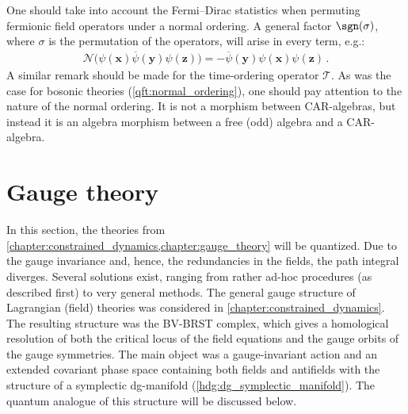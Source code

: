 
    \begin{remark}\label{qft:ordering_morphism}
        One should take into account the Fermi--Dirac statistics when permuting fermionic field operators under a normal ordering. A general factor $\sgn(\sigma)$, where $\sigma$ is the permutation of the operators, will arise in every term, e.g.:
        \begin{gather}
            \mathcal{N}\bigl(\psi(\symbf{x})\overline\psi(\symbf{y})\psi(\symbf{z})\bigr) = -\overline\psi(\symbf{y})\psi(\symbf{x})\psi(\symbf{z})\,.
        \end{gather}
        A similar remark should be made for the time-ordering operator $\mathcal{T}$. As was the case for bosonic theories (\cref{qft:normal_ordering}), one should pay attention to the nature of the normal ordering. It is not a morphism between CAR-algebras, but instead it is an algebra morphism between a free (odd) algebra and a CAR-algebra.
    \end{remark}

\section{Gauge theory}\label{section:qft_gauge_theory}

    In this section, the theories from \cref{chapter:constrained_dynamics,chapter:gauge_theory} will be quantized. Due to the gauge invariance and, hence, the redundancies in the fields, the path integral diverges. Several solutions exist, ranging from rather ad-hoc procedures (as described first) to very general methods. The general gauge structure of Lagrangian (field) theories was considered in \cref{chapter:constrained_dynamics}. The resulting structure was the BV-BRST complex, which gives a homological resolution of both the critical locus of the field equations and the gauge orbits of the gauge symmetries. The main object was a gauge-invariant action and an extended covariant phase space containing both fields and antifields with the structure of a symplectic dg-manifold (\cref{hdg:dg_symplectic_manifold}). The quantum analogue of this structure will be discussed below.

